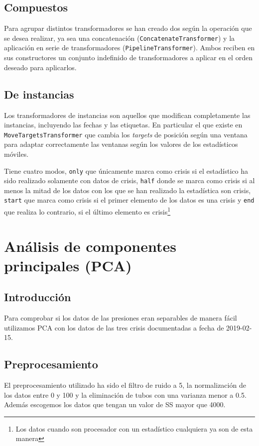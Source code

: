 \documentclass[a4paper,12pt,twoside,oldfontcommands]{memoir}
\begin{document}
\section{Compuestos}
Para agrupar distintos transformadores se han creado dos según la operación que se desea realizar, ya sea una concatenación (\texttt{ConcatenateTransformer}) y la aplicación en serie de transformadores (\texttt{PipelineTransformer}). Ambos reciben en sus constructores un conjunto indefinido de transformadores a aplicar en el orden deseado para aplicarlos.
\section{De instancias}
Los transformadores de instancias son aquellos que modifican completamente las instancias, incluyendo las fechas y las etiquetas. En particular el que existe en \texttt{MoveTargetsTransformer} que cambia los \textit{targets} de posición según una ventana para adaptar correctamente las ventanas según los valores de los estadísticos móviles.


Tiene cuatro modos, \texttt{only} que únicamente marca como crisis si el estadístico ha sido realizado solamente con datos de crisis, \texttt{half} donde se marca como crisis si al menos la mitad de los datos con los que se han realizado la estadística son crisis, \texttt{start} que marca como crisis si el primer elemento de los datos es una crisis y \texttt{end} que realiza lo contrario, si el último elemento es crisis\footnote{Los datos cuando son procesador con un estadístico cualquiera ya son de esta manera}
\chapter{Análisis de componentes principales (PCA)}
\section{Introducción}

Para comprobar si los datos de las presiones eran separables de manera fácil utilizamos PCA con los datos de las tres crisis documentadas a fecha de 2019-02-15.

\section{Preprocesamiento}
El preprocesamiento utilizado ha sido el filtro de ruido a 5, la normalización de los datos entre 0 y 100 y la eliminación de tubos con una varianza menor a 0.5. Además escogemos los datos que tengan un valor de SS mayor que 4000.
\end{document}
